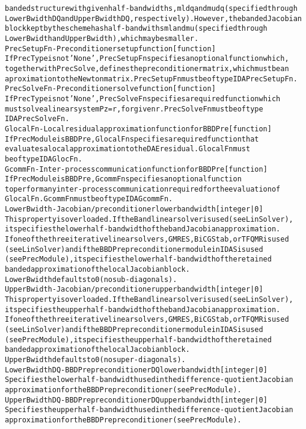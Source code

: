 \begin{alltt}
   banded structure with given half-bandwidths, mldq and mudq (specified through
   LowerBwidthDQ and UpperBwidthDQ, respectively). However, the banded Jacobian
   block kept by the scheme has half-bandwiths ml and mu (specified through
   LowerBwidth and UpperBwidth), which may be smaller.
PrecSetupFn - Preconditioner setup function [ function ]
   If PrecType is not 'None', PrecSetupFn specifies an optional function which,
   together with PrecSolve, defines the preconditioner matrix, which must be an
   aproximation to the Newton matrix. PrecSetupFn must be of type IDAPrecSetupFn.
PrecSolveFn - Preconditioner solve function [ function ]
   If PrecType is not 'None', PrecSolveFn specifies a required function which
   must solve a linear system Pz = r, for given r. PrecSolveFn must be of type
   IDAPrecSolveFn.
GlocalFn - Local residual approximation function for BBDPre [ function ]
   If PrecModule is BBDPre, GlocalFn specifies a required function that
   evaluates a local approximation to the DAE residual. GlocalFn must
   be of type IDAGlocFn.
GcommFn - Inter-process communication function for BBDPre [ function ]
   If PrecModule is BBDPre, GcommFn specifies an optional function
   to perform any inter-process communication required for the evaluation of
   GlocalFn. GcommFn must be of type IDAGcommFn.
LowerBwidth - Jacobian/preconditioner lower bandwidth [ integer | {0} ]
   This property is overloaded. If the Band linear solver is used (see LinSolver),
   it specifies the lower half-bandwidth of the band Jacobian approximation.
   If one of the three iterative linear solvers, GMRES, BiCGStab, or TFQMR is used
   (see LinSolver) and if the BBDPre preconditioner module in IDAS is used
   (see PrecModule), it specifies the lower half-bandwidth of the retained
   banded approximation of the local Jacobian block.
   LowerBwidth defaults to 0 (no sub-diagonals).
UpperBwidth - Jacobian/preconditioner upper bandwidth [ integer | {0} ]
   This property is overloaded. If the Band linear solver is used (see LinSolver),
   it specifies the upper half-bandwidth of the band Jacobian approximation.
   If one of the three iterative linear solvers, GMRES, BiCGStab, or TFQMR is used
   (see LinSolver) and if the BBDPre preconditioner module in IDAS is used
   (see PrecModule), it specifies the upper half-bandwidth of the retained
   banded approximation of the local Jacobian block.
   UpperBwidth defaults to 0 (no super-diagonals).
LowerBwidthDQ - BBDPre preconditioner DQ lower bandwidth [ integer | {0} ]
   Specifies the lower half-bandwidth used in the difference-quotient Jacobian
   approximation for the BBDPre preconditioner (see PrecModule).
UpperBwidthDQ - BBDPre preconditioner DQ upper bandwidth [ integer | {0} ]
   Specifies the upper half-bandwidth used in the difference-quotient Jacobian
   approximation for the BBDPre preconditioner (see PrecModule).


\end{alltt}
